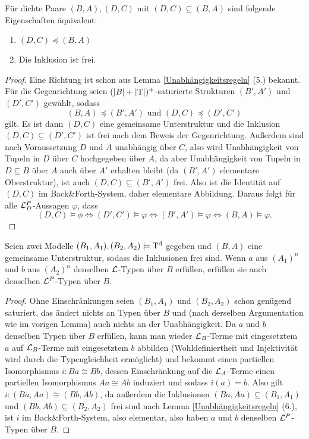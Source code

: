 \begin{lemma}\label{freie Inklusionen}
	Für dichte Paare $(B,A),(D,C)$ mit $(D,C)\subseteq(B,A)$ sind folgende Eigenschaften äquivalent:
	\begin{enumerate}
		\item $(D,C)\preceq(B,A)$
		\item Die Inklusion ist frei.
	\end{enumerate}
\end{lemma}
\begin{proof}
	Eine Richtung ist schon aus Lemma \ref{Unabhängigkeitsregeln} (5.) bekannt.\\
	Für die Gegenrichtung seien $({\left| B \right|}+{\left| \operatorname{T} \right|})^+$-saturierte Strukturen $(B',A')$ und $(D',C')$ gewählt, sodass $$(B,A)\preceq(B',A')\text{ und }(D,C)\preceq(D',C')$$ gilt. Es ist dann $(D,C)$ eine gemeinsame Unterstruktur und die Inklusion $(D,C)\subseteq(D',C')$ ist frei nach dem Beweis der Gegenrichtung. Außerdem sind nach Voraussetzung $D$ und $A$ unabhängig über $C$, also wird Unabhängigkeit von Tupeln in $D$ über $C$ \glqq{}hochgegeben\grqq{} über $A$, da aber Unabhängigkeit von Tupeln in $D\subseteq B$ über $A$ auch über $A'$ erhalten bleibt (da $(B',A')$ elementare Oberstruktur), ist auch $(D,C)\subseteq(B',A')$ frei. Also ist die Identität auf $(D,C)$ im Back\&Forth-System, daher elementare Abbildung. Daraus folgt für alle $\mathcal{L}^P_D$-Aussagen $\varphi$, dass $$(D,C)\models\phi\Leftrightarrow(D',C')\models\varphi\Leftrightarrow(B',A')\models\varphi\Leftrightarrow(B,A)\models\varphi.$$
\end{proof}

\begin{lemma}\label{Gemeinsame Unterstruktur}
	Seien zwei Modelle $(B_1,A_1),(B_2,A_2)\models\operatorname{T^d}$ gegeben und $(B,A)$ eine gemeinsame Unterstruktur, sodass die Inklusionen frei sind. Wenn $a$ aus $(A_1)^n$ und $b$ aus $(A_2)^n$ denselben $\mathcal{L}$-Typen über $B$ erfüllen, erfüllen sie auch denselben $\mathcal{L}^P$-Typen über $B$.
\end{lemma}
\begin{proof}
	Ohne Einschränkungen seien $(B_1,A_1)$ und $(B_2,A_2)$ schon genügend saturiert, das ändert nichts an Typen über $B$ und (nach derselben Argumentation wie im vorigen Lemma) auch nichts an der Unabhängigkeit. Da $a$ und $b$ denselben Typen über $B$ erfüllen, kann man wieder $\mathcal{L}_B$-Terme mit eingesetztem $a$ auf $\mathcal{L}_B$-Terme mit eingesetztem $b$ abbilden (Wohldefiniertheit und Injektivität wird durch die Typengleichheit ermöglicht) und bekommt einen partiellen Isomorphismus $i:Ba\cong Bb$, dessen Einschränkung auf die $\mathcal{L}_A$-Terme einen partiellen Isomorphismus $Aa\cong Ab$ induziert und sodass $i(a)=b$. Also gilt $i:(Ba,Aa)\cong(Bb,Ab)$, da außerdem die Inklusionen $(Ba,Aa)\subseteq(B_1,A_1)$ und $(Bb,Ab)\subseteq(B_2,A_2)$ frei sind nach Lemma \ref{Unabhängigkeitsregeln} (6.), ist $i$ im Back\&Forth-System, also elementar, also haben $a$ und $b$ denselben $\mathcal{L}^P$-Typen über $B$.
\end{proof}

